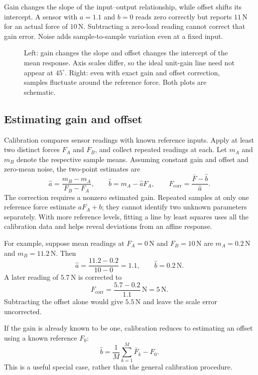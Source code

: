 Gain changes the slope of the input--output relationship, while offset
shifts its intercept. A sensor with $a=1.1$ and $b=0$ reads zero correctly
but reports $11\,\mathrm N$ for an actual force of $10\,\mathrm N$.
Subtracting a zero-load reading cannot correct that gain error. Noise adds
sample-to-sample variation even at a fixed input.

\begin{figure}[htbp]
\centering
\caption{Left: gain changes the slope and offset changes the intercept of
 the mean response. Axis scales differ, so the ideal unit-gain line need
 not appear at $45^\circ$. Right: even with exact gain and offset correction,
 samples fluctuate around the reference force. Both plots are schematic.}
\label{fig:l06-errors}
\end{figure}

\subsection{Estimating gain and offset}
Calibration compares sensor readings with known reference inputs. Apply
at least two distinct forces $F_A$ and $F_B$, and collect repeated readings
at each. Let $m_A$ and $m_B$ denote the respective sample means. Assuming
constant gain and offset and zero-mean noise, the two-point estimates are
\begin{equation}
 \widehat a=\frac{m_B-m_A}{F_B-F_A},\qquad
 \widehat b=m_A-\widehat a F_A,\qquad
 F_{\mathrm{corr}}=\frac{\bar F-\widehat b}{\widehat a}.
 \label{eq:l06-calibration}
\end{equation}
The correction requires a nonzero estimated gain. Repeated samples at only
one reference force estimate $aF_A+b$; they cannot identify two unknown
parameters separately. With more reference levels, fitting a line by
least squares uses all the calibration data and helps reveal deviations
from an affine response.

For example, suppose mean readings at $F_A=0\,\mathrm N$ and
$F_B=10\,\mathrm N$ are $m_A=0.2\,\mathrm N$ and $m_B=11.2\,\mathrm N$.
Then
\[
 \widehat a=\frac{11.2-0.2}{10-0}=1.1,\qquad
 \widehat b=0.2\,\mathrm N.
\]
A later reading of $5.7\,\mathrm N$ is corrected to
\[
 F_{\mathrm{corr}}=\frac{5.7-0.2}{1.1}\,\mathrm N=5\,\mathrm N.
\]
Subtracting the offset alone would give $5.5\,\mathrm N$ and leave the
scale error uncorrected.

If the gain is already known to be one, calibration reduces to estimating
an offset using a known reference $F_0$:
\[
 \widehat b=\frac{1}{M}\sum_{k=1}^M\bar F_k-F_0.
\]
This is a useful special case, rather than the general
calibration procedure.


